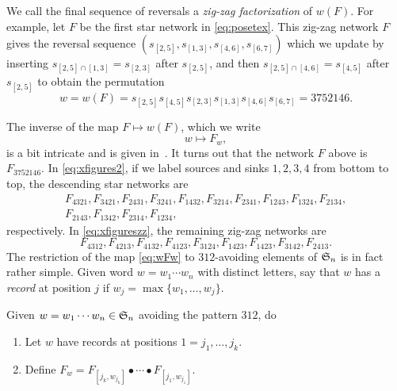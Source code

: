\documentclass[11pt]{article}
\theoremstyle{definition}
\numberwithin{equation}{section}
\begin{document}
We call the final sequence of reversals a
{\em zig-zag factorization} of $w(F)$.
For example, let $F$ be the first star network in \eqref{eq:posetex}.
This zig-zag network $F$ gives the
reversal sequence $(s_{[2,5]}, s_{[1,3]}, s_{[4,6]}, s_{[6,7]})$ which we update
by inserting $s_{[2,5] \cap [1,3]} = s_{[2,3]}$ after $s_{[2,5]}$, and then
$s_{[2,5] \cap [4,6]} = s_{[4,5]}$ after $s_{[2,5]}$ to obtain
the permutation
\begin{equation*}
  w = w(F) = s_{[2,5]}s_{[4,5]}s_{[2,3]}s_{[1,3]}s_{[4,6]}s_{[6,7]} = 3752146.
  \end{equation*}

The inverse of the map $F \mapsto w(F)$,
which we write
\begin{equation}\label{eq:wFw}
  w \mapsto F_w,
\end{equation}
is a bit intricate and is given in~\cite[\S 3]{SkanNNDCB}.
It turns out that the network $F$ above is $F_{3752146}$.
In \eqref{eq:xfigures2}, if we label sources and sinks $1, 2, 3, 4$ from bottom
to top, the descending star networks are
\begin{equation}\label{eq:dsnlist}
  \begin{gathered}
  F_{4321}, F_{3421}, F_{2431}, F_{3241}, F_{1432}, F_{3214}, F_{2341}, F_{1243}, F_{1324}, F_{2134}, \\
  F_{2143}, F_{1342}, F_{2314}, F_{1234},
  \end{gathered}
\end{equation}
respectively.
In \eqref{eq:xfigureszz}, the remaining zig-zag networks are
\begin{equation}\label{eq:zzlist}
  F_{4312}, F_{4213}, F_{4132}, F_{4123}, F_{3124}, F_{1423}, F_{1423}, F_{3142}, F_{2413}.
  \end{equation}
The restriction of the map \eqref{eq:wFw} to $312$-avoiding elements of $\mathfrak{S}_n$
is in fact rather simple.  Given word $w = w_1 \cdots w_n$
with distinct letters,
say that $w$ has a {\em record} at position $j$
if $w_j = \max\{ w_1, \dotsc, w_j \}$.

\begin{alg}\label{a:wFw}
  Given $w = w_1 \cdots w_n \in \mathfrak{S}_n$ avoiding the pattern $312$, do
  \begin{enumerate}
  \item Let $w$ have records at positions $1 = j_1, \dotsc, j_k$.
  \item Define
    $F_w = F_{[j_k,w_{j_k}]}
    \bullet \cdots \bullet F_{[j_1,w_{j_1}]}$.
  \end{enumerate}
\end{alg}
\end{document}
